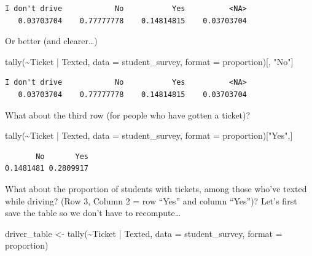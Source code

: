 \documentclass[
  letterpaper,
  DIV=11,
  numbers=noendperiod]{scrreprt}
\newenvironment{Shaded}{\begin{snugshade}}{\end{snugshade}}
\newcommand{\AttributeTok}[1]{\textcolor[rgb]{0.40,0.45,0.13}{#1}}
\newcommand{\FunctionTok}[1]{\textcolor[rgb]{0.28,0.35,0.67}{#1}}
\newcommand{\NormalTok}[1]{\textcolor[rgb]{0.00,0.23,0.31}{#1}}
\newcommand{\OtherTok}[1]{\textcolor[rgb]{0.00,0.23,0.31}{#1}}
\newcommand{\SpecialCharTok}[1]{\textcolor[rgb]{0.37,0.37,0.37}{#1}}
\newcommand{\StringTok}[1]{\textcolor[rgb]{0.13,0.47,0.30}{#1}}
\theoremstyle{remark}
\begin{document}
\begin{verbatim}
I don't drive            No           Yes          <NA> 
   0.03703704    0.77777778    0.14814815    0.03703704 
\end{verbatim}

Or better (and clearer\ldots)

\begin{Shaded}
\begin{Highlighting}[]
\FunctionTok{tally}\NormalTok{(}\SpecialCharTok{\textasciitilde{}}\NormalTok{Ticket }\SpecialCharTok{|}\NormalTok{ Texted, }
      \AttributeTok{data =}\NormalTok{ student\_survey,}
      \AttributeTok{format =} \StringTok{\textquotesingle{}proportion\textquotesingle{}}\NormalTok{)[, }\StringTok{"No"}\NormalTok{]}
\end{Highlighting}
\end{Shaded}

\begin{verbatim}
I don't drive            No           Yes          <NA> 
   0.03703704    0.77777778    0.14814815    0.03703704 
\end{verbatim}

What about the third row (for people who have gotten a ticket)?

\begin{Shaded}
\begin{Highlighting}[]
\FunctionTok{tally}\NormalTok{(}\SpecialCharTok{\textasciitilde{}}\NormalTok{Ticket }\SpecialCharTok{|}\NormalTok{ Texted, }
      \AttributeTok{data =}\NormalTok{ student\_survey, }
      \AttributeTok{format =} \StringTok{\textquotesingle{}proportion\textquotesingle{}}\NormalTok{)[}\StringTok{"Yes"}\NormalTok{,]}
\end{Highlighting}
\end{Shaded}

\begin{verbatim}
       No       Yes 
0.1481481 0.2809917 
\end{verbatim}

What about the proportion of students with tickets, among those who've
texted while driving? (Row 3, Column 2 = row ``Yes'' and column
``Yes'')? Let's first save the table so we don't have to
recompute\ldots{}

\begin{Shaded}
\begin{Highlighting}[]
\NormalTok{driver\_table }\OtherTok{\textless{}{-}} \FunctionTok{tally}\NormalTok{(}\SpecialCharTok{\textasciitilde{}}\NormalTok{Ticket }\SpecialCharTok{|}\NormalTok{ Texted, }
      \AttributeTok{data =}\NormalTok{ student\_survey, }
      \AttributeTok{format =} \StringTok{\textquotesingle{}proportion\textquotesingle{}}\NormalTok{)}
\end{Highlighting}
\end{Shaded}
\end{document}
